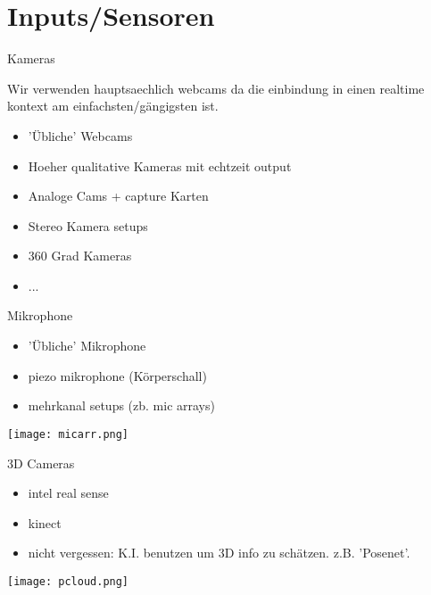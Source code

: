 \section{Inputs/Sensoren}
 \frame{\sectionpage}

\begin{frame}{Kameras}

Wir verwenden hauptsaechlich webcams da die einbindung in einen realtime kontext am einfachsten/gängigsten ist.

\begin{itemize}
	\item 'Übliche' Webcams
	\item Hoeher qualitative Kameras mit echtzeit output
	\item Analoge Cams + capture Karten
	\item Stereo Kamera setups
	\item 360 Grad Kameras
	\item ...
\end{itemize}

\end{frame}


\begin{frame}{Mikrophone}
\begin{itemize}
	\item 'Übliche' Mikrophone
	\item piezo mikrophone (Körperschall)
	\item mehrkanal setups (zb. mic arrays)
\end{itemize}
\texttt{[image: micarr.png]}

\end{frame}


\begin{frame}{3D Cameras}
\begin{itemize}
	\item intel real sense
	\item kinect
	\item nicht vergessen: K.I. benutzen um 3D info zu schätzen. z.B. 'Posenet'.
\end{itemize}
\texttt{[image: pcloud.png]}
\end{frame}


